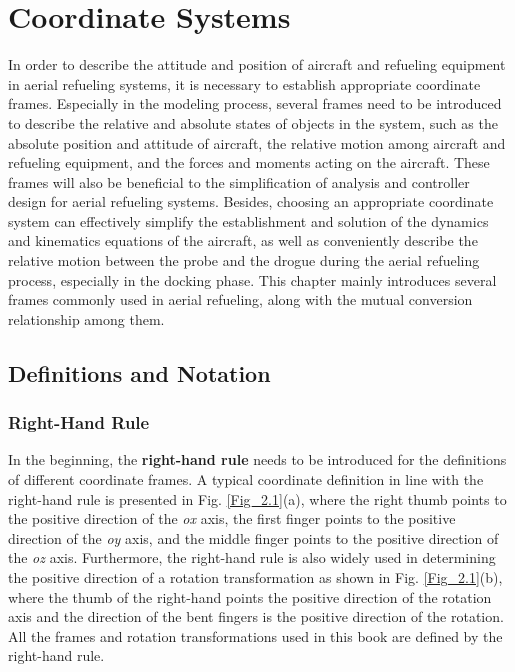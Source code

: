 
\chapter{Coordinate Systems}
\label{chap2}
In order to describe the attitude and position of aircraft and refueling
equipment in aerial refueling systems, it is necessary to establish
appropriate coordinate frames. Especially in the modeling process,
several frames need to be introduced to describe the relative and
absolute states of objects in the system, such as the absolute position
and attitude of aircraft, the relative motion among aircraft and refueling
equipment, and the forces and moments acting on the aircraft. These
frames will also be beneficial to the simplification of analysis and
controller design for aerial refueling systems. Besides, choosing
an appropriate coordinate system can effectively simplify the establishment
and solution of the dynamics and kinematics equations of the aircraft,
as well as conveniently describe the relative motion between the probe
and the drogue during the aerial refueling process, especially in
the docking phase. This chapter mainly introduces several frames commonly
used in aerial refueling, along with the mutual conversion relationship
among them.

\section{Definitions and Notation}

\subsection{Right-Hand Rule}

In the beginning, the \textbf{right-hand rule} needs to be introduced
for the definitions of different coordinate frames. A typical coordinate
definition in line with the right-hand rule is presented in Fig. \ref{Fig_2.1}(a),
where the right thumb points to the positive direction of the \textit{ox}
axis, the first finger points to the positive direction of the \textit{oy}
axis, and the middle finger points to the positive direction of the
\textit{oz} axis. Furthermore, the right-hand rule is also widely
used in determining the positive direction of a rotation transformation
as shown in Fig. \ref{Fig_2.1}(b), where the thumb of the right-hand
points the positive direction of the rotation axis and the direction
of the bent fingers is the positive direction of the rotation. All
the frames and rotation transformations used in this book are defined
by the right-hand rule. 

